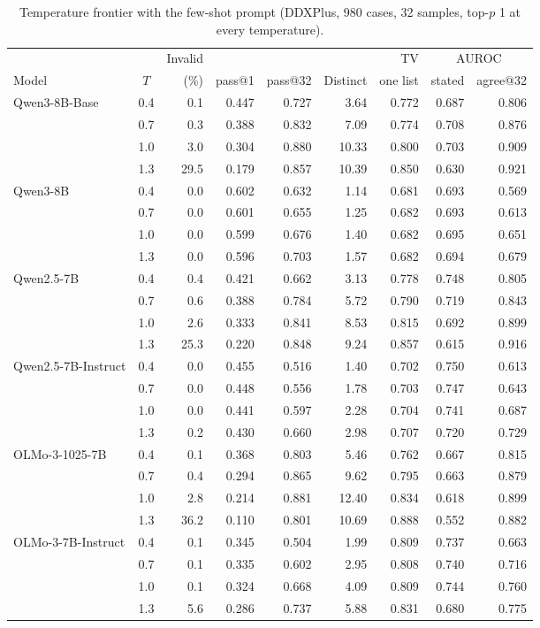 \documentclass[11pt]{article}
\begin{document}
\begin{table}[t]
\centering\small
\begin{adjustbox}{max width=\linewidth}
\begin{tabular}{lcrrrrrrr}
\toprule
 & & Invalid & & & & TV & \multicolumn{2}{c}{AUROC} \\
Model & $T$ & (\%) & pass@1 & pass@32 & Distinct & one list & stated & agree@32 \\
\midrule
Qwen3-8B-Base & 0.4 & 0.1 & 0.447 & 0.727 & 3.64 & 0.772 & 0.687 & 0.806 \\
 & 0.7 & 0.3 & 0.388 & 0.832 & 7.09 & 0.774 & 0.708 & 0.876 \\
 & 1.0 & 3.0 & 0.304 & 0.880 & 10.33 & 0.800 & 0.703 & 0.909 \\
 & 1.3 & 29.5 & 0.179 & 0.857 & 10.39 & 0.850 & 0.630 & 0.921 \\
Qwen3-8B & 0.4 & 0.0 & 0.602 & 0.632 & 1.14 & 0.681 & 0.693 & 0.569 \\
 & 0.7 & 0.0 & 0.601 & 0.655 & 1.25 & 0.682 & 0.693 & 0.613 \\
 & 1.0 & 0.0 & 0.599 & 0.676 & 1.40 & 0.682 & 0.695 & 0.651 \\
 & 1.3 & 0.0 & 0.596 & 0.703 & 1.57 & 0.682 & 0.694 & 0.679 \\
\midrule
Qwen2.5-7B & 0.4 & 0.4 & 0.421 & 0.662 & 3.13 & 0.778 & 0.748 & 0.805 \\
 & 0.7 & 0.6 & 0.388 & 0.784 & 5.72 & 0.790 & 0.719 & 0.843 \\
 & 1.0 & 2.6 & 0.333 & 0.841 & 8.53 & 0.815 & 0.692 & 0.899 \\
 & 1.3 & 25.3 & 0.220 & 0.848 & 9.24 & 0.857 & 0.615 & 0.916 \\
Qwen2.5-7B-Instruct & 0.4 & 0.0 & 0.455 & 0.516 & 1.40 & 0.702 & 0.750 & 0.613 \\
 & 0.7 & 0.0 & 0.448 & 0.556 & 1.78 & 0.703 & 0.747 & 0.643 \\
 & 1.0 & 0.0 & 0.441 & 0.597 & 2.28 & 0.704 & 0.741 & 0.687 \\
 & 1.3 & 0.2 & 0.430 & 0.660 & 2.98 & 0.707 & 0.720 & 0.729 \\
\midrule
OLMo-3-1025-7B & 0.4 & 0.1 & 0.368 & 0.803 & 5.46 & 0.762 & 0.667 & 0.815 \\
 & 0.7 & 0.4 & 0.294 & 0.865 & 9.62 & 0.795 & 0.663 & 0.879 \\
 & 1.0 & 2.8 & 0.214 & 0.881 & 12.40 & 0.834 & 0.618 & 0.899 \\
 & 1.3 & 36.2 & 0.110 & 0.801 & 10.69 & 0.888 & 0.552 & 0.882 \\
OLMo-3-7B-Instruct & 0.4 & 0.1 & 0.345 & 0.504 & 1.99 & 0.809 & 0.737 & 0.663 \\
 & 0.7 & 0.1 & 0.335 & 0.602 & 2.95 & 0.808 & 0.740 & 0.716 \\
 & 1.0 & 0.1 & 0.324 & 0.668 & 4.09 & 0.809 & 0.744 & 0.760 \\
 & 1.3 & 5.6 & 0.286 & 0.737 & 5.88 & 0.831 & 0.680 & 0.775 \\
\bottomrule
\end{tabular}
\end{adjustbox}
\caption{Temperature frontier with the few-shot prompt (DDXPlus, 980 cases, 32 samples, top-$p$ 1 at every temperature).}
\label{tab:frontier}
\end{table}
\end{document}
